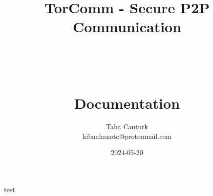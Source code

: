 \documentclass[a4paper,12pt]{article}
\title{
	\Huge TorComm - Secure P2P Communication \\
	\ \\
	\ \\
	\ \\
	\Large Documentation
}
\author{Taha Canturk\\kibnakanoto@protonmail.com}
\date{2024-05-20}
\begin{document}
\maketitle

\newpage

test
\end{document}
